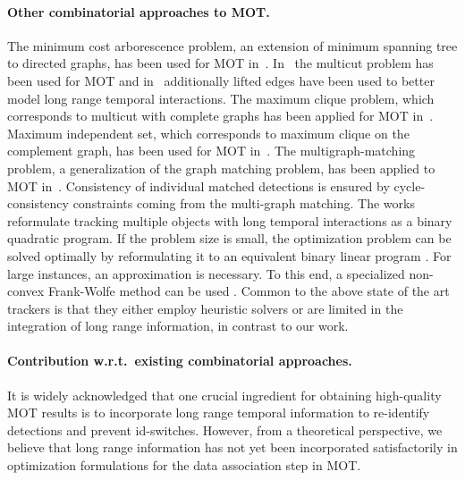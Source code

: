 \documentclass{article}
\begin{document}
\paragraph{Other combinatorial approaches to MOT.}

The minimum cost arborescence problem, an extension of minimum spanning tree to directed graphs, has been used for MOT in~\cite{henschel2014efficient}.
In~\cite{keuper2016multi,keuper2018motion,kumar2014multiple,ristani2014tracking,tang2015subgraph,tang2016multi} the multicut problem has been used for MOT and in~\cite{babaee2018multiple,tang2017multiple} additionally lifted edges have been used to better model long range temporal interactions.
The maximum clique problem, which corresponds to multicut with complete graphs has been applied for MOT in~\cite{zamir2012gmcp,dehghan2015gmmcp}.
Maximum independent set, which corresponds to maximum clique on the complement graph, has been used for MOT in~\cite{brendel2011multiobject}.
The multigraph-matching problem, a generalization of the graph matching problem, has been applied to MOT in~\cite{hu2019dual}.
Consistency of individual matched detections is ensured by cycle-consistency constraints coming from the multi-graph matching.
The works~\cite{Henschel_2018_CVPR_Workshops,henschel2016tracking} reformulate tracking multiple objects with long temporal interactions as a binary quadratic program. If the problem size is small, the optimization problem can be solved optimally by reformulating it to an equivalent binary linear program \cite{henschel2019simultaneous,von2018recovering}. For large instances, an approximation is necessary.  To this end, a specialized non-convex Frank-Wolfe method can be used \cite{Henschel_2018_CVPR_Workshops}.
Common to the above state of the art trackers is that they either employ heuristic solvers or are limited in the integration of long range information, in contrast to our work.


\paragraph{Contribution w.r.t.\ existing combinatorial approaches.}
It is widely acknowledged that one crucial ingredient for obtaining high-quality MOT results is to incorporate long range temporal information to re-identify detections and prevent id-switches.
However, from a theoretical perspective, we believe that long range information has not yet been incorporated satisfactorily in optimization formulations for the data association step in MOT.
\end{document}
